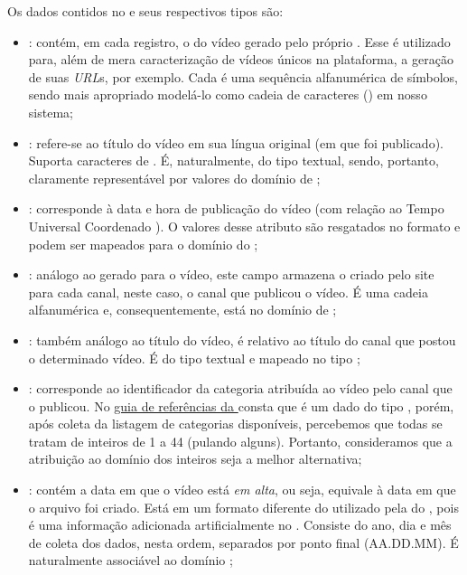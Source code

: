  Os dados contidos no  e seus respectivos tipos são:

  \begin{itemize}
    \item {}: contém, em cada registro, o  do vídeo gerado pelo próprio . Esse  é utilizado para, além de mera caracterização de vídeos únicos na plataforma, a geração de suas \textit{URL}s, por exemplo. Cada  é uma sequência alfanumérica de símbolos, sendo mais apropriado modelá-lo como cadeia de caracteres () em nosso sistema;
    \item {}: refere-se ao título do vídeo em sua língua original (em que foi publicado). Suporta caracteres de . É, naturalmente, do tipo textual, sendo, portanto, claramente representável por valores do domínio de ;
    \item {}: corresponde à data e hora de publicação do vídeo (com relação ao Tempo Universal Coordenado ). O valores desse atributo são resgatados no formato \href{https://www.w3.org/TR/NOTE-datetime}{} e podem ser mapeados para o domínio  do ;
    \item {}: análogo ao  gerado para o vídeo, este campo armazena o  criado pelo site para cada canal, neste caso, o canal que publicou o vídeo. É uma cadeia alfanumérica e, consequentemente, está no domínio de ;
    \item {}: também análogo ao título do vídeo, é relativo ao título do canal que postou o determinado vídeo. É do tipo textual e mapeado no tipo ;
    \item {}: corresponde ao identificador da categoria atribuída ao vídeo pelo canal que o publicou. No \href{https://developers.google.com/youtube/v3/docs/videos?hl=pt-br#snippet.categoryId}{guia de referências da } consta que é um dado do tipo , porém, após coleta da listagem de categorias disponíveis, percebemos que todas se tratam de inteiros de 1 a 44 (pulando alguns). Portanto, consideramos que a atribuição ao domínio dos inteiros seja a melhor alternativa;
    \item {}: contém a data em que o vídeo está \emph{em alta}, ou seja, equivale à data em que o arquivo  foi criado. Está em um formato diferente do utilizado pela  do , pois é uma informação adicionada artificialmente no . Consiste do ano, dia e mês de coleta dos dados, nesta ordem, separados por ponto final (AA.DD.MM). É naturalmente associável ao domínio ;

\end{itemize}
